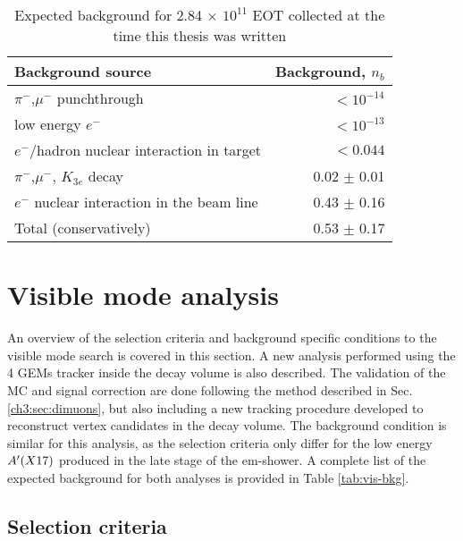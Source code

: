 \begin{table}[bth!]
  \centering
  \caption[Invisible mode background]{Expected background for 2.84 $\times$ $10^{11}$ EOT collected at the time this thesis was written \cite{NA64:2019imj}}
  \begin{tabular}{lr}
    \hline \hline
    Background source & Background, $n_b$ \\
    \hline
    $\pi^-$,$\mu^-$ punchthrough                      & $<10^{-14}$ \\
    low energy $e^-$                                  & $<10^{-13}$ \\
    $e^-$/hadron nuclear interaction in target        & $<0.044$   \\
    $\pi^-$,$\mu^-$, $K_{3e}$ decay                    & 0.02 $\pm$ 0.01 \\
    $e^-$ nuclear interaction in the  beam line       & 0.43 $\pm$ 0.16 \\
    \hline
    Total (conservatively)                            & 0.53 $\pm$ 0.17 \\
    \hline \hline                       
  \end{tabular}
  \label{tab:inv-bkg}
\end{table}


\FloatBarrier\noindent
\section{Visible mode analysis}
\label{ch3:sec:analysis-vis}

An overview of the selection criteria and background specific conditions to the visible mode search is covered in this section. A new analysis performed using the 4 GEMs tracker inside the decay volume is also described. The validation of the MC and signal correction are done following the method described in Sec.\ref{ch3:sec:dimuons}, but also including a new tracking procedure developed to reconstruct vertex candidates in the decay volume. The background condition is similar for this analysis, as the selection criteria only differ for the low energy $A'(X17)$ produced in the late stage of the em-shower. A complete list of the expected background for both analyses is provided in Table \ref{tab:vis-bkg}.

\subsection{Selection criteria}
\label{ch3:sec:selection-criteria-vis}

